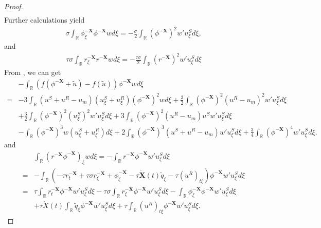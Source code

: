 \documentclass[10pt,reqno]{amsart}
\numberwithin{equation}{section}
\begin{document}
\begin{proof}
\begin{align*}
		\end{align*}
		Further calculations yield
		\begin{align*}
			\sigma\int_{\mathbb{R}}\phi_{\xi}^{-\mathbf{X}}\phi^{-\mathbf{X}}wd\xi=-\frac{\sigma}{2}\int_{\mathbb{R}}\left(\phi^{-\mathbf{X}}\right)^2w'u_{\xi}^{S}d\xi,
		\end{align*}
		and
		\begin{align*}
			\tau\sigma\int_{\mathbb{R}}r_{\xi}^{-\mathbf{X}}r^{-\mathbf{X}}wd\xi=-\frac{\tau\sigma}{2}\int_{\mathbb{R}}\left(r^{-\mathbf{X}}\right)^2w'u_{\xi}^{S}d\xi
		\end{align*}
		From \cite{ref16}, we can get
		\begin{equation} 
			\begin{aligned}
				&-\int_{\mathbb{R}} (f(\phi^{-\mathbf{X}} + \tilde{u}) - f(\tilde{u})) \phi^{-\mathbf{X}} w d\xi\\
				=&-3\int_{\mathbb{R}}(u^S + u^R - u_m)(u_{\xi}^S + u_{\xi}^R)(\phi^{-\mathbf{X}})^2wd\xi + \frac{3}{2}\int_{\mathbb{R}}(\phi^{-\mathbf{X}})^2(u^R - u_m)^2w'u_{\xi}^Sd\xi\\
				&+\frac{3}{2}\int_{\mathbb{R}}(\phi^{-\mathbf{X}})^2(u_{\xi}^S)^2w'u_{\xi}^Sd\xi + 3\int_{\mathbb{R}}(\phi^{-\mathbf{X}})^2(u^R - u_m)u^Sw'u_{\xi}^Sd\xi\\
				&-\int_{\mathbb{R}}(\phi^{-\mathbf{X}})^3w(u_{\xi}^S + u_{\xi}^R)d\xi + 2\int_{\mathbb{R}}(\phi^{-\mathbf{X}})^3(u^S + u^R - u_m)w'u_{\xi}^Sd\xi+\frac{3}{4}\int_{\mathbb{R}}(\phi^{-\mathbf{X}})^4w'u_{\xi}^Sd\xi. 
			\end{aligned}
		\end{equation}
		and
		\begin{align}\label{11}
			&\int_{\mathbb{R}}\left(r^{-\mathbf{X}}\phi^{-\mathbf{X}}\right)_{\xi}wd\xi=-\int_{\mathbb{R}}r^{-\mathbf{X}}\phi^{-\mathbf{X}}w'u_{\xi}^Sd\xi\nonumber\\
			=&-\int_{\mathbb{R}}\left(-\tau r_{t}^{-\mathbf{X}}+\tau\sigma r_{\xi}^{-\mathbf{X}}+\phi_{\xi}^{-\mathbf{X}}-\tau \dot{\mathbf{X}}(t) \tilde{q}_{\xi}-\tau \left(u^{R}\right)_{t\xi}\right)\phi^{-\mathbf{X}}w'u_{\xi}^Sd\xi\nonumber\\
			=&\tau\int_{\mathbb{R}}r_{t}^{-\mathbf{X}}\phi^{-\mathbf{X}}w'u_{\xi}^Sd\xi-\tau\sigma\int_{\mathbb{R}}r_{\xi}^{-\mathbf{X}}\phi^{-\mathbf{X}}w'u_{\xi}^Sd\xi-\int_{\mathbb{R}}\phi_{\xi}^{-\mathbf{X}}\phi^{-\mathbf{X}}w'u_{\xi}^Sd\xi\nonumber\\
			&+\tau\dot{X}(t)\int_{\mathbb{R}}\tilde{q}_{\xi}\phi^{-\mathbf{X}}w'u_{\xi}^Sd\xi+\tau\int_{\mathbb{R}}\left(u^{R}\right)_{t\xi}\phi^{-\mathbf{X}}w'u_{\xi}^Sd\xi.

\end{align}
\end{proof}
\end{document}

